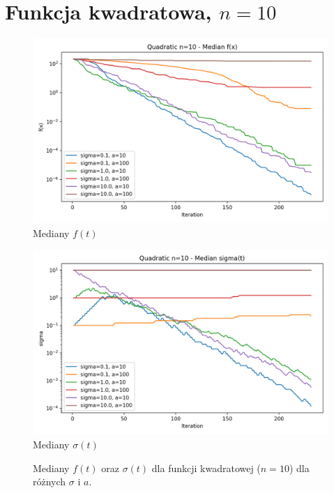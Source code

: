\documentclass[a4paper,12pt]{article}
\begin{document}
\section{Funkcja kwadratowa, $n=10$}
\begin{figure}[H]
    \centering
    \begin{minipage}{0.48\textwidth}
        \centering
        \includegraphics[width=\textwidth]{charts/Quadratic_n10_all_medians.png}\\
        \small Mediany $f(t)$
    \end{minipage}\hfill
    \begin{minipage}{0.48\textwidth}
        \centering
        \includegraphics[width=\textwidth]{charts/Quadratic_n10_all_sigmas.png}\\
        \small Mediany $\sigma(t)$
    \end{minipage}
    \caption{Mediany $f(t)$ oraz $\sigma(t)$ dla funkcji kwadratowej ($n=10$) dla różnych $\sigma$ i $a$.}
\end{figure}
\end{document}
